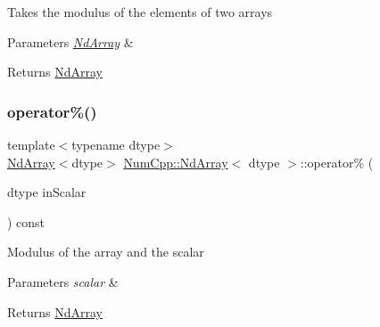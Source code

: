 Takes the modulus of the elements of two arrays


\begin{DoxyParams}{Parameters}
{\em \mbox{\hyperlink{class_num_cpp_1_1_nd_array}{Nd\+Array}}} & \\
\hline
\end{DoxyParams}
\begin{DoxyReturn}{Returns}
\mbox{\hyperlink{class_num_cpp_1_1_nd_array}{Nd\+Array}} 
\end{DoxyReturn}
\mbox{\label{class_num_cpp_1_1_nd_array_af8c7fd5cf1b2194a271cf8be378266e1}} 
\subsubsection{\texorpdfstring{operator\%()}{operator\%()}\hspace{0.1cm}{\footnotesize\ttfamily [2/2]}}
{\footnotesize\ttfamily template$<$typename dtype$>$ \\
\mbox{\hyperlink{class_num_cpp_1_1_nd_array}{Nd\+Array}}$<$dtype$>$ \mbox{\hyperlink{class_num_cpp_1_1_nd_array}{Num\+Cpp\+::\+Nd\+Array}}$<$ dtype $>$\+::operator\% (\begin{DoxyParamCaption}\item[{dtype}]{in\+Scalar }\end{DoxyParamCaption}) const\hspace{0.3cm}{\ttfamily [inline]}}

Modulus of the array and the scalar


\begin{DoxyParams}{Parameters}
{\em scalar} & \\
\hline
\end{DoxyParams}
\begin{DoxyReturn}{Returns}
\mbox{\hyperlink{class_num_cpp_1_1_nd_array}{Nd\+Array}} 
\end{DoxyReturn}
\mbox{\label{class_num_cpp_1_1_nd_array_a5006af93b42ff0d1bd2bee123a9b8706}} 
